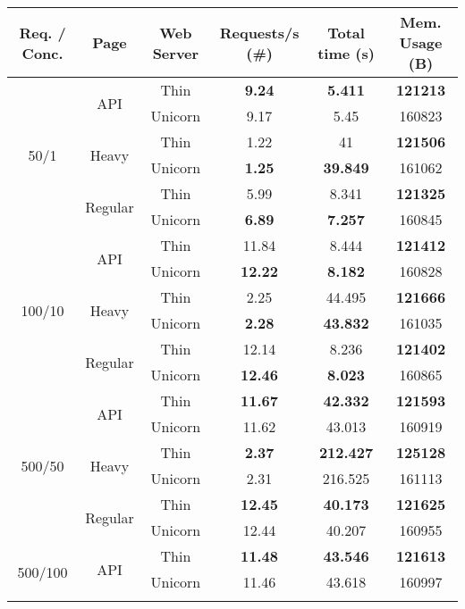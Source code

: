 \begin{table}[h!t]
\begin{tabular}{c|c|c|c|c|c}
    \textbf{Req. / Conc.} & \textbf{Page} & \textbf{Web Server} & \textbf{Requests/s (\#)} & \textbf{Total time (s)} & \textbf{Mem. Usage (B)} \\ \hline
    \multirow{6}{*}{50/1} & \multirow{2}{*}{API} & Thin & \textbf{9.24} & \textbf{5.411} & \textbf{121213}\\\cline{3-6}
     &  & Unicorn & 9.17 & 5.45 & 160823\\\cline{2-6}
     & \multirow{2}{*}{Heavy} & Thin & 1.22 & 41 & \textbf{121506}\\\cline{3-6}
     &  & Unicorn & \textbf{1.25} & \textbf{39.849} & 161062\\\cline{2-6}
     & \multirow{2}{*}{Regular} & Thin & 5.99 & 8.341 & \textbf{121325}\\\cline{3-6}
     &  & Unicorn & \textbf{6.89} & \textbf{7.257} & 160845\\\hline
    \multirow{6}{*}{100/10} & \multirow{2}{*}{API} & Thin & 11.84 & 8.444 & \textbf{121412}\\\cline{3-6}
     &  & Unicorn & \textbf{12.22} & \textbf{8.182} & 160828\\\cline{2-6}
     & \multirow{2}{*}{Heavy} & Thin & 2.25 & 44.495 & \textbf{121666}\\\cline{3-6}
     &  & Unicorn & \textbf{2.28} & \textbf{43.832} & 161035\\\cline{2-6}
     & \multirow{2}{*}{Regular} & Thin & 12.14 & 8.236 & \textbf{121402}\\\cline{3-6}
     &  & Unicorn & \textbf{12.46} & \textbf{8.023} & 160865\\\hline
    \multirow{6}{*}{500/50} & \multirow{2}{*}{API} & Thin & \textbf{11.67} & \textbf{42.332} & \textbf{121593}\\\cline{3-6}
     &  & Unicorn & 11.62 & 43.013 & 160919\\\cline{2-6}
     & \multirow{2}{*}{Heavy} & Thin & \textbf{2.37} & \textbf{212.427} & \textbf{125128}\\\cline{3-6}
     &  & Unicorn & 2.31 & 216.525 & 161113\\\cline{2-6}
     & \multirow{2}{*}{Regular} & Thin & \textbf{12.45} & \textbf{40.173} & \textbf{121625}\\\cline{3-6}
     &  & Unicorn & 12.44 & 40.207 & 160955\\\hline
    \multirow{6}{*}{500/100} & \multirow{2}{*}{API} & Thin & \textbf{11.48} & \textbf{43.546} & \textbf{121613}\\\cline{3-6}
     &  & Unicorn & 11.46 & 43.618 & 160997\\\cline{2-6}

\end{tabular}
\end{table}
